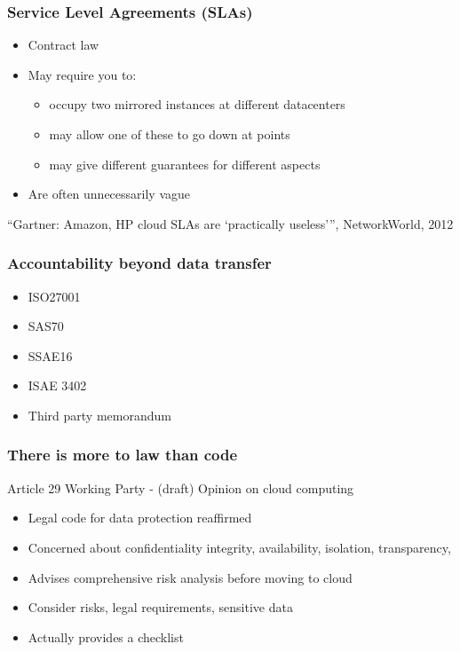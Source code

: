 \documentclass{beamer}
\begin{document}
\begin{frame}
    \frametitle{Service Level Agreements (SLAs)}
    \begin{itemize}
    \item Contract law
    \item May require you to:
      \begin{itemize} %
        \item occupy two mirrored instances at different datacenters
        \item may allow one of these to go down at points
        \item may give different guarantees for different aspects
      \end{itemize}
    \item Are often unnecessarily vague
    \end{itemize}
    \footnotesize{``Gartner: Amazon, HP cloud SLAs are `practically useless''', NetworkWorld, 2012}
\end{frame}

\begin{frame}
    \frametitle{Accountability beyond data transfer}
    \begin{itemize}
    \item ISO27001
    \item SAS70 %
    \item SSAE16 %
    \item ISAE 3402 %
    \item Third party memorandum
    \end{itemize}
\end{frame}

\begin{frame}
    \frametitle{There is more to law than code}
    Article 29 Working Party - (draft) Opinion on cloud computing
    \begin{itemize}
    \item Legal code for data protection reaffirmed
    \item Concerned about confidentiality integrity, availability, isolation, transparency, 
    \item Advises comprehensive risk analysis before moving to cloud
    \item Consider risks, legal requirements, sensitive data
    \item Actually provides a checklist
    \end{itemize}
\end{frame}
\end{document}
